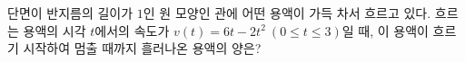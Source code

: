 단면이 반지름의 길이가 $1$인 원 모양인 관에 어떤 용액이 가득 차서 흐르고 있다. 흐르는 용액의 시각 $t$에서의 속도가 $v(t)=6t-2t^2\ (0\le t\le 3)$일 때, 이 용액이 흐르기 시작하여 멈출 때까지 흘러나온 용액의 양은?
\dmchoicesauto{}{$6\pi$}{$7\pi$}{$8\pi$}{$9\pi$}{$10\pi$}
